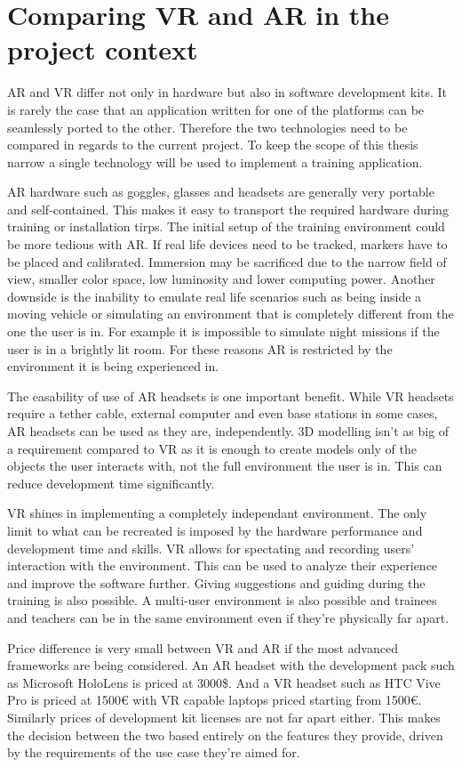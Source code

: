 \documentclass[12pt, a4paper,oneside, nocenter]{thesis}
\begin{document}
\section{Comparing VR and AR in the project context}
AR and VR differ not only in hardware but also in software development kits. It is rarely the case that an application written for one of the platforms can be seamlessly ported to the other. Therefore the two technologies need to be compared in regards to the current project. To keep the scope of this thesis narrow a single technology will be used to implement a training application.
\par
AR hardware such as goggles, glasses and headsets are generally very portable and self-contained. This makes it easy to transport the required hardware during training or installation tirps. The initial setup of the training environment could be more tedious with AR. If real life devices need to be tracked, markers have to be placed and calibrated. Immersion may be sacrificed due to the narrow field of view\citep{hololens-specs}, smaller color space, low luminosity and lower computing power. Another downside is the inability to emulate real life scenarios such as being inside a moving vehicle or simulating an environment that is completely different from the one the user is in. For example it is impossible to simulate night missions if the user is in a brightly lit room. For these reasons AR is restricted by the environment it is being experienced in.
\par
The easability of use of AR headsets is one important benefit. While VR headsets require a tether cable, external computer and even base stations in some cases, AR headsets can be used as they are, independently. 3D modelling isn't as big of a requirement compared to VR as it is enough to create models only of the objects the user interacts with, not the full environment the user is in. This can reduce development time significantly.
\par
VR shines in implementing a completely independant environment. The only limit to what can be recreated is imposed by the hardware performance and development time and skills. VR allows for spectating and recording users' interaction with the environment. This can be used to analyze their experience and improve the software further. Giving suggestions and guiding during the training is also possible. A multi-user environment is also possible and trainees and teachers can be in the same environment even if they're physically far apart.
\par
Price difference is very small between VR and AR if the most advanced frameworks are being considered. An AR headset with the development pack such as Microsoft HoloLens is priced at 3000\$\citep{hololens-price}. And a VR headset such as HTC Vive Pro is priced at 1500\euro\citep{htc-vive-pro} with VR capable laptops priced starting from 1500\euro. Similarly prices of development kit licenses are not far apart either. This makes the decision between the two based entirely on the features they provide, driven by the requirements of the use case they're aimed for.
\par
\end{document}
